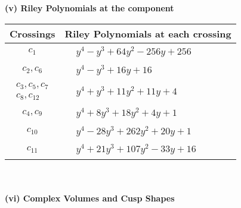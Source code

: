 \documentclass[1p]{elsarticle_modified}
\theoremstyle{definition}
\begin{document}
\newpage\renewcommand{\arraystretch}{1}
\flushleft \textbf{(v) Riley Polynomials at the component}\newline \\
\begin{tabular}{m{50pt}|m{274pt}}
Crossings & \hspace{64pt}Riley Polynomials at each crossing \\
\hline $$\begin{aligned}c_{1}\end{aligned}$$&$\begin{aligned}
&y^4- y^3+64 y^2-256 y+256
\end{aligned}$\\
\hline $$\begin{aligned}c_{2},c_{6}\end{aligned}$$&$\begin{aligned}
&y^4- y^3+16 y+16
\end{aligned}$\\
\hline $$\begin{aligned}c_{3},c_{5},c_{7}\\c_{8},c_{12}\end{aligned}$$&$\begin{aligned}
&y^4+y^3+11 y^2+11 y+4
\end{aligned}$\\
\hline $$\begin{aligned}c_{4},c_{9}\end{aligned}$$&$\begin{aligned}
&y^4+8 y^3+18 y^2+4 y+1
\end{aligned}$\\
\hline $$\begin{aligned}c_{10}\end{aligned}$$&$\begin{aligned}
&y^4-28 y^3+262 y^2+20 y+1
\end{aligned}$\\
\hline $$\begin{aligned}c_{11}\end{aligned}$$&$\begin{aligned}
&y^4+21 y^3+107 y^2-33 y+16
\end{aligned}$\\
\hline
\end{tabular}\\~\\
\newpage\flushleft \textbf{(vi) Complex Volumes and Cusp Shapes}
\end{document}
